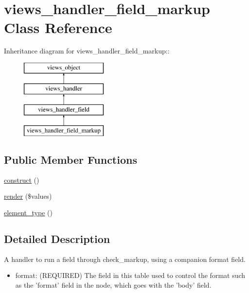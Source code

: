 \hypertarget{classviews__handler__field__markup}{
\section{views\_\-handler\_\-field\_\-markup Class Reference}
\label{classviews__handler__field__markup}
}
Inheritance diagram for views\_\-handler\_\-field\_\-markup::\begin{figure}[H]
\begin{center}
\leavevmode
\includegraphics[height=4cm]{classviews__handler__field__markup}
\end{center}
\end{figure}
\subsection*{Public Member Functions}
\begin{CompactItemize}
\item 
\hyperlink{classviews__handler__field__markup_ddc5d6e6130133c1d65d8b96dce502a5}{construct} ()
\item 
\hyperlink{classviews__handler__field__markup_7a6eb0c91f30643eb29d19dcc76b23d3}{render} (\$values)
\item 
\hyperlink{classviews__handler__field__markup_0de6d7c5e99dfd22ce7e7a4662af8082}{element\_\-type} ()
\end{CompactItemize}


\subsection{Detailed Description}
A handler to run a field through check\_\-markup, using a companion format field.

\begin{itemize}
\item format: (REQUIRED) The field in this table used to control the format such as the 'format' field in the node, which goes with the 'body' field. \end{itemize}


